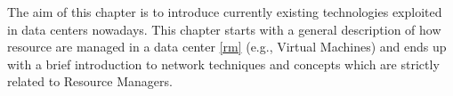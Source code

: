 The aim of this chapter is to introduce currently existing technologies exploited in data centers nowadays.
This chapter starts with a general description of how resource are managed in a data center \autoref{rm} (e.g., Virtual Machines) and ends up with a brief introduction to network techniques and concepts which are strictly related to Resource Managers.